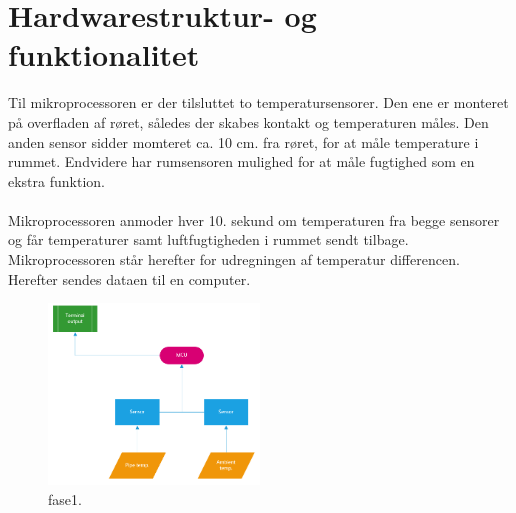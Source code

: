 \section{Hardwarestruktur- og funktionalitet}
Til mikroprocessoren er der tilsluttet to  temperatursensorer. Den ene er monteret på overfladen af røret, således der skabes kontakt og temperaturen måles. Den anden sensor sidder momteret ca. 10 cm. fra røret, for at måle temperature i rummet. Endvidere har rumsensoren mulighed for at måle fugtighed som en ekstra funktion.
\\
\\
Mikroprocessoren anmoder hver 10. sekund om temperaturen fra begge sensorer og får temperaturer samt luftfugtigheden i rummet sendt tilbage. 
Mikroprocessoren står herefter for udregningen af temperatur differencen. Herefter
sendes dataen til en computer.\newline

\begin{figure}[h!]
  \caption{fase1.}
  \centering
  \includegraphics[width=0.5\textwidth]{figures/Phase1.PNG}
\end{figure}








